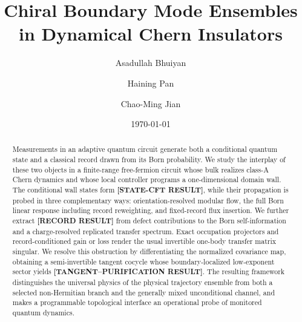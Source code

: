\documentclass[aps,prx,twocolumn,superscriptaddress,longbibliography,nofootinbib,floatfix]{revtex4-2}
\newcommand{\ResultPlaceholder}[1]{\ignorespaces}
\newcommand{\ResultValue}[1]{\textcolor{BrickRed}{\textbf{[#1]}}}
\begin{document}
\title{Chiral Boundary Mode Ensembles in Dynamical Chern Insulators}

\author{Asadullah Bhuiyan}
\author{Haining Pan}
\author{Chao-Ming Jian}

\date{\today}

\begin{abstract}
Measurements in an adaptive quantum circuit generate both a conditional quantum state and a classical record drawn from its Born probability.  We study the interplay of these two objects in a finite-range free-fermion circuit whose bulk realizes class-A Chern dynamics and whose local controller programs a one-dimensional domain wall.  The conditional wall states form \ResultValue{STATE-CFT RESULT}, while their propagation is probed in three complementary ways: orientation-resolved modular flow, the full Born linear response including record reweighting, and fixed-record flux insertion.  We further extract \ResultValue{RECORD RESULT} from defect contributions to the Born self-information and a charge-resolved replicated transfer spectrum.  Exact occupation projectors and record-conditioned gain or loss render the usual invertible one-body transfer matrix singular.  We resolve this obstruction by differentiating the normalized covariance map, obtaining a semi-invertible tangent cocycle whose boundary-localized low-exponent sector yields \ResultValue{TANGENT--PURIFICATION RESULT}.  The resulting framework distinguishes the universal physics of the physical trajectory ensemble from both a selected non-Hermitian branch and the generally mixed unconditional channel, and makes a programmable topological interface an operational probe of monitored quantum dynamics.
\ResultPlaceholder{Acceptance-dependent central result: report a stable record effective central charge and sector dimensions only after the replica normalization, bulk subtraction, aspect-ratio collapse, and large-size extrapolation pass the stated acceptance tests.}
\end{abstract}

\maketitle

\ResultPlaceholder{The title and record-CFT headline are retained only
if the replica-calibrated self-information and charge-resolved transfer-spectrum gates in the
numerical campaign both pass.}
\end{document}
